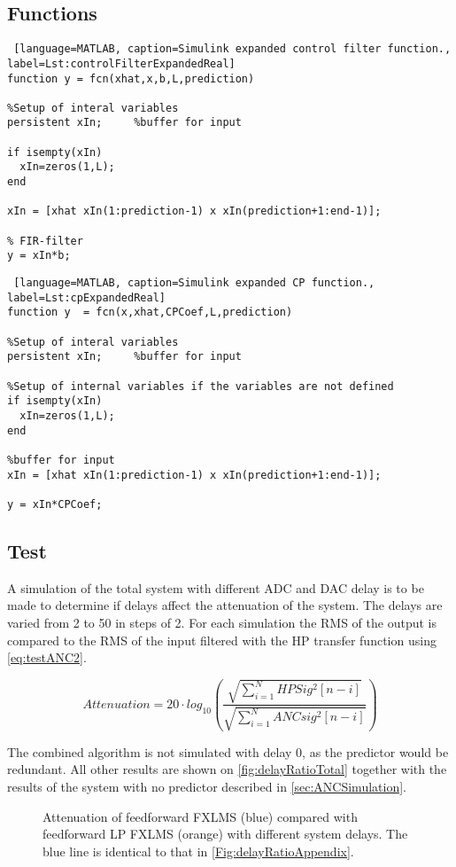 \subsection{Functions}

\begin{lstlisting} [language=MATLAB, caption=Simulink expanded control filter function., label=Lst:controlFilterExpandedReal]
function y = fcn(xhat,x,b,L,prediction)

%Setup of interal variables
persistent xIn;     %buffer for input

if isempty(xIn)
  xIn=zeros(1,L);
end

xIn = [xhat xIn(1:prediction-1) x xIn(prediction+1:end-1)];

% FIR-filter
y = xIn*b;
\end{lstlisting}

\begin{lstlisting} [language=MATLAB, caption=Simulink expanded CP function., label=Lst:cpExpandedReal]
function y  = fcn(x,xhat,CPCoef,L,prediction)

%Setup of interal variables
persistent xIn;     %buffer for input

%Setup of internal variables if the variables are not defined
if isempty(xIn)
  xIn=zeros(1,L);
end

%buffer for input
xIn = [xhat xIn(1:prediction-1) x xIn(prediction+1:end-1)];

y = xIn*CPCoef;
\end{lstlisting}

\subsection{Test}
A simulation of the total system with different ADC and DAC delay is to be made to determine if delays affect the attenuation of the system. The delays are varied from 2 to 50 in steps of 2. For each simulation the RMS of the output is compared to the RMS of the input filtered with the HP transfer function using \autoref{eq:testANC2}. 

\begin{equation}\label{eq:testANC2}
	Attenuation=20 \cdot log_{10} \left (\frac{\sqrt{\sum\limits_{i=1}^{N}HPSig^2[n-i]}}{\sqrt{\sum\limits_{i=1}^{N}ANCsig^2[n-i]}}  \right )
\end{equation}

The combined algorithm is not simulated with delay 0, as the predictor would be redundant. All other results are shown on \autoref{fig:delayRatioTotal} together with the results of the system with no predictor described in \autoref{sec:ANCSimulation}.
\begin{figure}[H]
	\centering
	\caption{ Attenuation of feedforward FXLMS (blue) compared with feedforward LP FXLMS (orange) with different system delays. The blue line is identical to that in \autoref{Fig:delayRatioAppendix}.}
		\label{fig:delayRatioTotal}
\end{figure}

